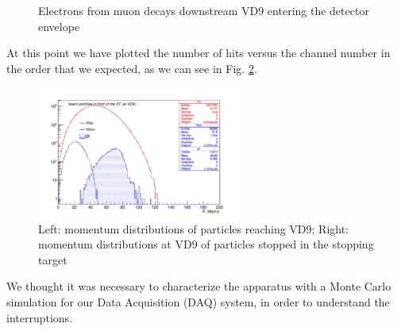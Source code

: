 \documentclass[12pt]{article}
\begin{document}
\begin{figure}[H]
  \hspace{-0.5in}
  \caption{
    \label{fig:1}
    Electrons from muon decays downstream VD9 entering the detector envelope
  }
\end{figure}
At this point we have plotted the number of hits versus the channel number in the order that we expected, as we can see in Fig. \ref{fig:2}.

\begin{figure}[H]
      \includegraphics[width=0.6\textwidth]{figures/pdf/figure_03700_bmum0s37b0_vdet_xx09_mom}
  \caption{
    \label{fig:2}
    Left: momentum distributions of particles reaching VD9;
    Right: momentum distributions at VD9 of particles stopped in the stopping target
  }
\end{figure}
We thought it was necessary to characterize the apparatus with a Monte Carlo simulation for our Data Acquisition (DAQ) system, in order to understand the interruptions.
\end{document}
